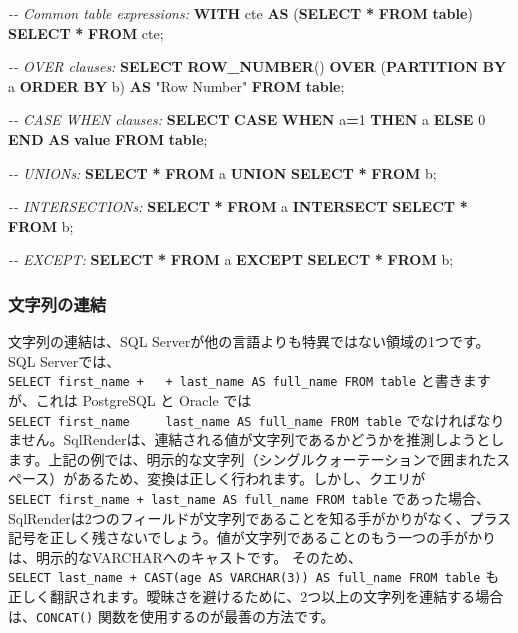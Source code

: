 \documentclass[
  11pt]{book}
\newenvironment{Shaded}{\begin{snugshade}}{\end{snugshade}}
\newcommand{\CommentTok}[1]{\textcolor[rgb]{0.56,0.35,0.01}{\textit{#1}}}
\newcommand{\ControlFlowTok}[1]{\textcolor[rgb]{0.13,0.29,0.53}{\textbf{#1}}}
\newcommand{\DecValTok}[1]{\textcolor[rgb]{0.00,0.00,0.81}{#1}}
\newcommand{\FunctionTok}[1]{\textcolor[rgb]{0.13,0.29,0.53}{\textbf{#1}}}
\newcommand{\KeywordTok}[1]{\textcolor[rgb]{0.13,0.29,0.53}{\textbf{#1}}}
\newcommand{\NormalTok}[1]{#1}
\newcommand{\OperatorTok}[1]{\textcolor[rgb]{0.81,0.36,0.00}{\textbf{#1}}}
\newcommand{\OtherTok}[1]{\textcolor[rgb]{0.56,0.35,0.01}{#1}}
\theoremstyle{definition}
\theoremstyle{definition}
\theoremstyle{definition}
\theoremstyle{definition}
\theoremstyle{remark}
\begin{document}
\begin{Shaded}
\begin{Highlighting}[]
\CommentTok{{-}{-} Common table expressions:}
\KeywordTok{WITH}\NormalTok{ cte }\KeywordTok{AS}\NormalTok{ (}\KeywordTok{SELECT} \OperatorTok{*} \KeywordTok{FROM} \KeywordTok{table}\NormalTok{) }\KeywordTok{SELECT} \OperatorTok{*} \KeywordTok{FROM}\NormalTok{ cte;}

\CommentTok{{-}{-} OVER clauses:}
\KeywordTok{SELECT} \FunctionTok{ROW\_NUMBER}\NormalTok{() }\KeywordTok{OVER}\NormalTok{ (}\KeywordTok{PARTITION} \KeywordTok{BY}\NormalTok{ a }\KeywordTok{ORDER} \KeywordTok{BY}\NormalTok{ b)}
  \KeywordTok{AS} \OtherTok{"Row Number"} \KeywordTok{FROM} \KeywordTok{table}\NormalTok{;}

\CommentTok{{-}{-} CASE WHEN clauses:}
\KeywordTok{SELECT} \ControlFlowTok{CASE} \ControlFlowTok{WHEN}\NormalTok{ a}\OperatorTok{=}\DecValTok{1} \ControlFlowTok{THEN}\NormalTok{ a }\ControlFlowTok{ELSE} \DecValTok{0} \ControlFlowTok{END} \KeywordTok{AS} \FunctionTok{value} \KeywordTok{FROM} \KeywordTok{table}\NormalTok{;}

\CommentTok{{-}{-} UNIONs:}
\KeywordTok{SELECT} \OperatorTok{*} \KeywordTok{FROM}\NormalTok{ a }\KeywordTok{UNION} \KeywordTok{SELECT} \OperatorTok{*} \KeywordTok{FROM}\NormalTok{ b;}

\CommentTok{{-}{-} INTERSECTIONs:}
\KeywordTok{SELECT} \OperatorTok{*} \KeywordTok{FROM}\NormalTok{ a }\KeywordTok{INTERSECT} \KeywordTok{SELECT} \OperatorTok{*} \KeywordTok{FROM}\NormalTok{ b;}

\CommentTok{{-}{-} EXCEPT:}
\KeywordTok{SELECT} \OperatorTok{*} \KeywordTok{FROM}\NormalTok{ a }\KeywordTok{EXCEPT} \KeywordTok{SELECT} \OperatorTok{*} \KeywordTok{FROM}\NormalTok{ b;}
\end{Highlighting}
\end{Shaded}

\subsubsection*{文字列の連結}\label{ux6587ux5b57ux5217ux306eux9023ux7d50}

文字列の連結は、SQL Serverが他の言語よりも特異ではない領域の1つです。SQL Serverでは、\texttt{SELECT\ first\_name\ +\ \textquotesingle{}\ \textquotesingle{}\ +\ last\_name\ AS\ full\_name\ FROM\ table} と書きますが、これは PostgreSQL と Oracle では \texttt{SELECT\ first\_name\ \textbar{}\textbar{}\ \textquotesingle{}\ \textquotesingle{}\ \textbar{}\textbar{}\ last\_name\ AS\ full\_name\ FROM\ table} でなければなりません。SqlRenderは、連結される値が文字列であるかどうかを推測しようとします。上記の例では、明示的な文字列（シングルクォーテーションで囲まれたスペース）があるため、変換は正しく行われます。しかし、クエリが \texttt{SELECT\ first\_name\ +\ last\_name\ AS\ full\_name\ FROM\ table} であった場合、SqlRenderは2つのフィールドが文字列であることを知る手がかりがなく、プラス記号を正しく残さないでしょう。値が文字列であることのもう一つの手がかりは、明示的なVARCHARへのキャストです。 そのため、\texttt{SELECT\ last\_name\ +\ CAST(age\ AS\ VARCHAR(3))\ AS\ full\_name\ FROM\ table} も正しく翻訳されます。曖昧さを避けるために、2つ以上の文字列を連結する場合は、\texttt{CONCAT()} 関数を使用するのが最善の方法です。
\end{document}
